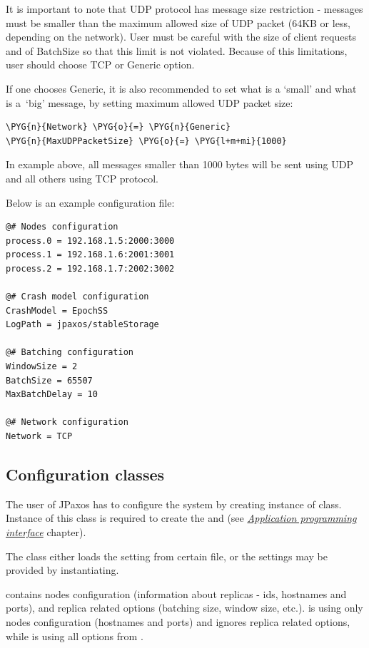 It is important to note that UDP protocol has message size restriction -
messages must be smaller than the maximum allowed size of UDP packet (64KB or
less, depending on the network). User must be careful with the size of client
requests and of BatchSize so that this limit is not violated. Because of this
limitations, user should choose TCP or Generic option.

If one chooses Generic, it is also recommended to set what is a `small' and
what is a~`big' message, by setting maximum allowed UDP packet size:

\begin{Verbatim}[commandchars=\\\{\}]
\PYG{n}{Network} \PYG{o}{=} \PYG{n}{Generic}
\PYG{n}{MaxUDPPacketSize} \PYG{o}{=} \PYG{l+m+mi}{1000}
\end{Verbatim}

In example above, all messages smaller than 1000 bytes will be sent using UDP
and all others using TCP protocol.

\label{config:example-file}

Below is an example configuration file:

\begin{Verbatim}[commandchars=@\[\]]
@# Nodes configuration
process.0 = 192.168.1.5:2000:3000
process.1 = 192.168.1.6:2001:3001
process.2 = 192.168.1.7:2002:3002

@# Crash model configuration
CrashModel = EpochSS
LogPath = jpaxos/stableStorage

@# Batching configuration
WindowSize = 2
BatchSize = 65507
MaxBatchDelay = 10

@# Network configuration
Network = TCP
\end{Verbatim}


\subsection{Configuration classes}
\label{config:configuration-classes}
The user of JPaxos has to configure the system by creating instance of
 class. Instance of this class is required to create the
 and  (see {\hyperref[api:jpaxos-api]{\emph{Application programming interface}}} chapter).

The  class either loads the setting from certain file, or the
settings may be provided by instantiating.

 contains nodes configuration (information about replicas - ids,
hostnames and ports), and replica related options (batching size, window size,
etc.).  is using only nodes configuration (hostnames and ports) and
ignores replica related options, while  is using all options from
.

